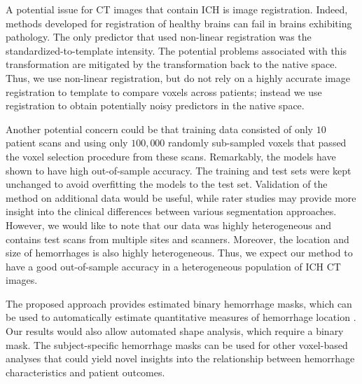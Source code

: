 \documentclass{elsarticle_nonatbib}\usepackage[]{graphicx}\usepackage[]{color}
\begin{document}
A potential issue for CT images that contain ICH is image registration.  Indeed, methods developed for registration of healthy brains can fail in brains exhibiting pathology.  The only predictor that used non-linear registration was the standardized-to-template intensity. The potential problems associated with this transformation are mitigated by the transformation back to the native space.
Thus, we use non-linear registration, but do not rely on a highly accurate image registration to template to compare voxels across patients; instead we use registration to obtain potentially noisy predictors in the native space.

Another potential concern could be that training data consisted of only $10$ patient scans and using only $100{,}000$ randomly sub-sampled voxels that passed the voxel selection procedure from these scans.  Remarkably, the models have shown to have high out-of-sample accuracy.  The training and test sets were kept unchanged to avoid overfitting the models to the test set.
Validation of the method on additional data would be useful, while rater studies may provide more insight into the clinical differences between various segmentation approaches.  However, we would like to note that our data was highly heterogeneous and contains test scans from multiple sites and scanners. Moreover, the location and size of hemorrhages is also highly heterogeneous.  Thus, we expect our method to have a good out-of-sample accuracy in a heterogeneous population of ICH CT images.

The proposed approach provides estimated binary hemorrhage masks, which can be used to automatically estimate quantitative measures of hemorrhage location \citep{muschelli2015quantitative}.  Our results would also allow automated shape analysis, which require a binary mask.  The subject-specific hemorrhage masks can be used for other voxel-based analyses that could yield novel insights into the relationship between hemorrhage characteristics and patient outcomes.
\end{document}
